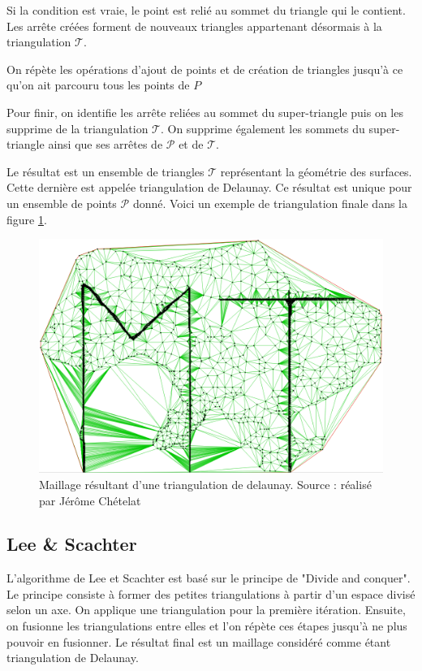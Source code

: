 Si la condition est vraie, le point est relié au sommet du triangle qui le contient.
Les arrête créées forment de nouveaux triangles appartenant désormais à la
triangulation $\mathcal{T}$.

On répète les opérations d'ajout de points et de création de triangles jusqu'à ce qu'on ait parcouru tous les points de $P$

Pour finir, on identifie les arrête reliées au sommet du super-triangle puis on
les supprime de la triangulation $\mathcal{T}$.
On supprime également les sommets du super-triangle ainsi que ses arrêtes de 
$\mathcal{P}$ et de $\mathcal{T}$.

Le résultat est un ensemble de triangles $\mathcal{T}$ représentant la géométrie
des surfaces. Cette dernière est appelée triangulation de Delaunay.
Ce résultat est unique pour un ensemble de points $\mathcal{P}$ donné.
Voici un exemple de triangulation finale dans la figure \ref{fig:example_delaunay}.

\begin{figure}[htbp!]
    \centering
    \includegraphics[width=0.8\linewidth]{figures/example_delaunay.png}
    \caption{Maillage résultant d'une triangulation de delaunay. Source : réalisé par Jérôme Chételat}
    \label{fig:example_delaunay}
\end{figure}

\subsection{Lee \& Scachter}

L'algorithme de Lee et Scachter est basé sur le principe de "Divide and conquer".
Le principe consiste à former des petites triangulations à partir d'un espace divisé selon un axe. On applique une triangulation pour la première itération. Ensuite, on fusionne les triangulations entre elles et l'on répète ces étapes jusqu'à ne plus pouvoir en fusionner. Le résultat final est un maillage considéré comme étant triangulation de Delaunay. 

